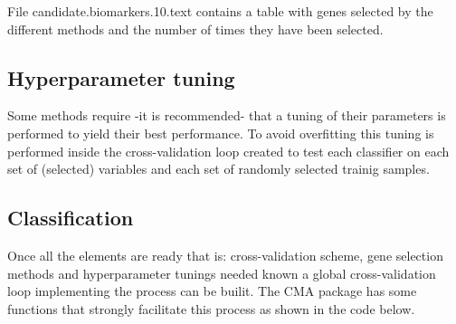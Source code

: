 \documentclass{article}\usepackage[]{graphicx}\usepackage[]{color}
\begin{document}
File candidate.biomarkers.10.text contains a table with genes selected by the different methods and the number of times they have been selected.

\subsection{Hyperparameter tuning}

Some methods require -it is recommended- that a tuning of their parameters is performed to yield their best performance.
To avoid overfitting this tuning is performed inside the cross-validation loop created to test each classifier on each set of (selected) variables and each set of randomly selected trainig samples.

\subsection{Classification}

Once all the elements are ready that is: cross-validation scheme, gene selection methods and hyperparameter tunings needed known a global cross-validation loop implementing the process can be builit. The CMA package has some functions that strongly facilitate this process as shown in the code below.
\end{document}
